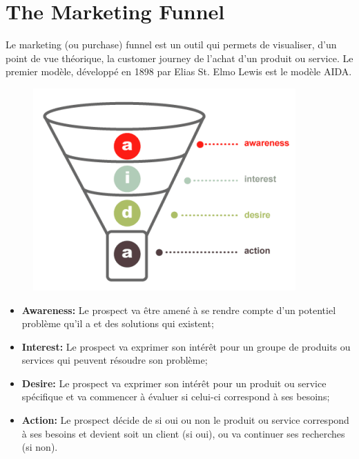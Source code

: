 \vspace{-1.2cm}

\section{The Marketing Funnel}

Le marketing (ou purchase) funnel est un outil qui permets de visualiser, d'un point de vue théorique, la customer journey de l'achat d'un produit ou service. Le premier modèle, développé en 1898 par Elias St. Elmo Lewis est le modèle AIDA.
\vspace{-0.7cm}

\begin{minipage}[t]{0.4\textwidth}
\begin{figure}[H]
\hspace{-2cm}
\includegraphics[scale=0.60]{../images/lec6img1}
\end{figure}
\end{minipage}
\begin{minipage}[t]{0.7\textwidth}
\vspace{1.8cm}
\begin{itemize}
\item \textbf{Awareness:} Le prospect va être amené à se rendre compte d'un potentiel problème qu'il a et des solutions qui existent;
\item \textbf{Interest:} Le prospect va exprimer son intérêt pour un groupe de produits ou services qui peuvent résoudre son problème;
\item \textbf{Desire:} Le prospect va exprimer son intérêt pour un produit ou service spécifique et va commencer à évaluer si celui-ci correspond à ses besoins;
\item \textbf{Action:} Le prospect décide de si oui ou non le produit ou service correspond à ses besoins et devient soit un client (si oui), ou va continuer ses recherches (si non).
\end{itemize}
\end{minipage}
\vspace{0.2cm}

